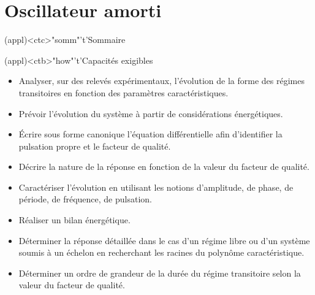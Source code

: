 \documentclass[../../main/main.tex]{subfiles}
\begin{document}
\setcounter{chapter}{4}


\chapter{Oscillateur amorti}

\vspace*{\fill}

\begin{tcn}(appl)<ctc>"somm"'t'{Sommaire}
	\let\item\olditem
	\vspace{-15pt}
	\minitoc
	\vspace{-25pt}
\end{tcn}

\begin{tcn}[sidebyside](appl)<ctb>"how"'t'{Capacités exigibles}
	\begin{itemize}[label=\rcheck]
		\item Analyser, sur des relevés expérimentaux, l'évolution de la forme des
		      régimes transitoires en fonction des paramètres caractéristiques.
		\item Prévoir l'évolution du système à partir de considérations
		      énergétiques.
		\item Écrire sous forme canonique l'équation différentielle afin
		      d'identifier la pulsation propre et le facteur de qualité.
		\item Décrire la nature de la réponse en fonction de la valeur du facteur
		      de qualité.
	\end{itemize}
	\tcblower
	\begin{itemize}[label=\rcheck]
		\item Caractériser l'évolution en utilisant les notions d'amplitude, de
		      phase, de période, de fréquence, de pulsation.
		\item Réaliser un bilan énergétique.
		\item Déterminer la réponse détaillée dans le cas d'un régime libre ou
		      d'un système soumis à un échelon en recherchant les racines du
		      polynôme caractéristique.
		\item Déterminer un ordre de grandeur de la durée du régime transitoire
		      selon la valeur du facteur de qualité.
	\end{itemize}
\end{tcn}

\vspace*{\fill}
\newpage
\vspace*{\fill}
\end{document}
